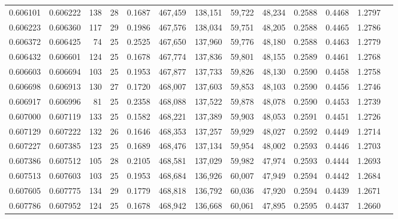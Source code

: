 \begin{tabular}{rrrrrrrrrrrrr}
0.606101 & 0.606222 &   138 &  28 &                                     0.1687 & 467,459 & 138,151 &  59,722 &  48,234 & 0.2588 & 0.4468 & 1.2797 \\
0.606223 & 0.606360 &   117 &  29 &                                     0.1986 & 467,576 & 138,034 &  59,751 &  48,205 & 0.2588 & 0.4465 & 1.2786 \\
0.606372 & 0.606425 &    74 &  25 &                                     0.2525 & 467,650 & 137,960 &  59,776 &  48,180 & 0.2588 & 0.4463 & 1.2779 \\
0.606432 & 0.606601 &   124 &  25 &                                     0.1678 & 467,774 & 137,836 &  59,801 &  48,155 & 0.2589 & 0.4461 & 1.2768 \\
0.606603 & 0.606694 &   103 &  25 &                                     0.1953 & 467,877 & 137,733 &  59,826 &  48,130 & 0.2590 & 0.4458 & 1.2758 \\
0.606698 & 0.606913 &   130 &  27 &                                     0.1720 & 468,007 & 137,603 &  59,853 &  48,103 & 0.2590 & 0.4456 & 1.2746 \\
0.606917 & 0.606996 &    81 &  25 &                                     0.2358 & 468,088 & 137,522 &  59,878 &  48,078 & 0.2590 & 0.4453 & 1.2739 \\
0.607000 & 0.607119 &   133 &  25 &                                     0.1582 & 468,221 & 137,389 &  59,903 &  48,053 & 0.2591 & 0.4451 & 1.2726 \\
0.607129 & 0.607222 &   132 &  26 &                                     0.1646 & 468,353 & 137,257 &  59,929 &  48,027 & 0.2592 & 0.4449 & 1.2714 \\
0.607227 & 0.607385 &   123 &  25 &                                     0.1689 & 468,476 & 137,134 &  59,954 &  48,002 & 0.2593 & 0.4446 & 1.2703 \\
0.607386 & 0.607512 &   105 &  28 &                                     0.2105 & 468,581 & 137,029 &  59,982 &  47,974 & 0.2593 & 0.4444 & 1.2693 \\
0.607513 & 0.607603 &   103 &  25 &                                     0.1953 & 468,684 & 136,926 &  60,007 &  47,949 & 0.2594 & 0.4442 & 1.2684 \\
0.607605 & 0.607775 &   134 &  29 &                                     0.1779 & 468,818 & 136,792 &  60,036 &  47,920 & 0.2594 & 0.4439 & 1.2671 \\
0.607786 & 0.607952 &   124 &  25 &                                     0.1678 & 468,942 & 136,668 &  60,061 &  47,895 & 0.2595 & 0.4437 & 1.2660 \\

\end{tabular}
